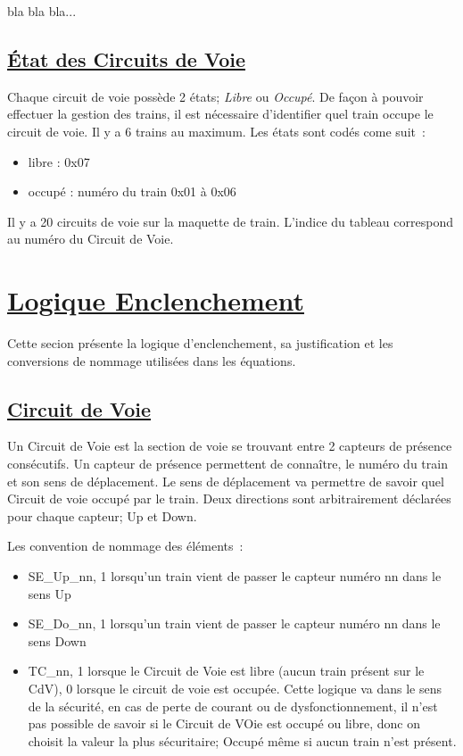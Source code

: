 bla bla bla...

  
\subsection{\underline{\'Etat des Circuits de Voie}}
\label{sec:st_sig}

Chaque circuit de voie possède 2 états; \emph{Libre} ou
\emph{Occupé}. De façon à pouvoir effectuer la gestion des trains, il
est nécessaire d'identifier quel train occupe le circuit de voie.  Il
y a 6 trains au maximum. Les états sont codés come suit~:
\begin{itemize}
  \item libre : 0x07
  \item occupé : numéro du train 0x01 à 0x06
\end{itemize}  

Il y a 20 circuits de voie sur la maquette de train. L'indice du
tableau correspond au numéro du Circuit de Voie.




\newpage
\section{\underline{Logique Enclenchement}}
\label{sec:log_enc}

Cette secion présente la logique d'enclenchement, sa justification et
les conversions de nommage utilisées dans les équations.

\subsection{\underline{Circuit de Voie}}
\label{sec:CdV}

Un Circuit de Voie est la section de voie se trouvant entre 2 capteurs
de présence consécutifs. Un capteur de présence permettent de
connaître, le numéro du train et son sens de déplacement. Le sens de
déplacement va permettre de savoir quel Circuit de voie occupé par le
train. Deux directions sont arbitrairement déclarées pour chaque
capteur; Up et Down.

Les convention de nommage des éléments~:
\begin{itemize}
\item SE\_Up\_nn, 1 lorsqu'un train vient de passer le capteur numéro
  nn dans le sens Up
\item SE\_Do\_nn, 1 lorsqu'un train vient de passer le capteur numéro
  nn dans le sens Down
\item TC\_nn, 1 lorsque le Circuit de Voie est libre (aucun train
  présent sur le CdV), 0 lorsque le circuit de voie est occupée. Cette
  logique va dans le sens de la sécurité, en cas de perte de courant
  ou de dysfonctionnement, il n'est pas possible de savoir si le
  Circuit de VOie est occupé ou libre, donc on choisit la valeur la
  plus sécuritaire; Occupé même si aucun train n'est présent.
\end{itemize}

